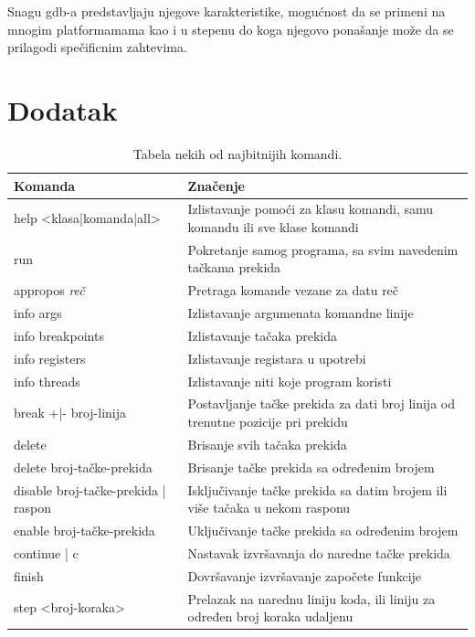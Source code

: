 \documentclass[a4paper]{article}
\begin{document}
Snagu gdb-a predstavljaju njegove karakteristike, mogućnost da se primeni na mnogim platformamama kao i u 
stepenu do koga njegovo ponašanje može da se prilagodi spečificnim zahtevima.  \cite{gnu}


\appendix
 


\section{Dodatak}
\label{dodatak}

\begin{table}[!h!]
\begin{center}
\caption{Tabela nekih od najbitnijih komandi.}
\begin{tabular}{|p{4cm}|p{6cm}|} \hline
Komanda & Značenje\\ \hline
help <klasa|komanda|all> & Izlistavanje pomoći za klasu komandi, samu komandu ili sve klase komandi\\ \hline
run & Pokretanje samog programa, sa svim navedenim tačkama prekida \\ \hline
appropos \textit{reč} & Pretraga komande vezane za datu reč\\ \hline
info args & Izlistavanje argumenata komandne linije \\ \hline
info breakpoints & Izlistavanje tačaka prekida \\ \hline
info registers & Izlistavanje registara u upotrebi \\ \hline
info threads & Izlistavanje niti koje program koristi \\ \hline
break +|- broj-linija & Postavljanje tačke prekida za dati broj linija od trenutne pozicije pri prekidu \\ \hline
delete & Brisanje svih tačaka prekida \\ \hline
delete broj-tačke-prekida & Brisanje tačke prekida sa određenim brojem \\ \hline
disable broj-tačke-prekida | raspon & Isključivanje tačke prekida sa datim brojem ili više tačaka u nekom rasponu \\ \hline
enable broj-tačke-prekida & Uključivanje tačke prekida sa određenim brojem \\ \hline
continue | c & Nastavak izvršavanja do naredne tačke prekida \\ \hline
finish & Dovršavanje izvršavanje započete funkcije \\ \hline
step <broj-koraka> & Prelazak na narednu liniju koda, ili liniju za određen broj koraka udaljenu \\ \hline

\end{tabular}
\end{center}
\end{table}
\end{document}
